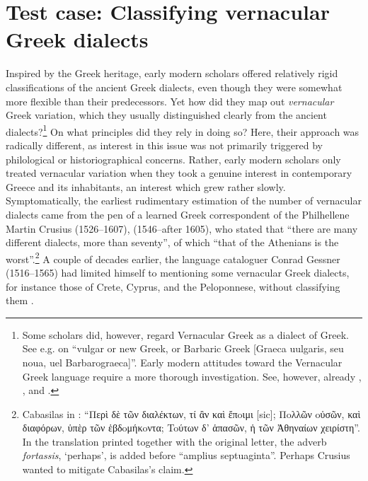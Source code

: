 \section{Test case: Classifying vernacular Greek dialects}\label{sec:2.10}

Inspired by the Greek heritage, early modern scholars offered relatively rigid classifications of the ancient Greek dialects, even though they were somewhat more flexible than their predecessors. Yet how did they map out \textit{vernacular} Greek variation, which they usually distinguished clearly from the ancient dialects?\footnote{Some scholars did, however, regard Vernacular Greek as a dialect of Greek. See e.g. \citet[{\footnotesize{)(}}.7\textsc{\textsuperscript{v}}]{Megiser1603} on “vulgar or new Greek, or Barbaric Greek [Graeca uulgaris, seu noua, uel Barbarograeca]”. Early modern attitudes toward the Vernacular Greek language require a more thorough investigation. See, however, already \citet{Caratzas1952}, \citet{Rotolo1973}, and \citet{Toufexis2005}.} On what principles did they rely in doing so? Here, their approach was radically different, as interest in this issue was not primarily triggered by philological or historiographical concerns. Rather, early modern scholars only treated vernacular variation when they took a genuine interest in contemporary Greece and its inhabitants, an interest which grew rather slowly. Symptomatically, the earliest rudimentary estimation of the number of vernacular dialects came from the pen of a learned Greek correspondent of the  Philhellene Martin Crusius (1526–1607),  (1546–after 1605), who stated that “there are many different dialects, more than seventy”, of which “that of the Athenians is the worst”.\footnote{Cabasilas in \citet[461]{Crusius1584}: “Περὶ δὲ τῶν διαλέκτων, τί ἂν καὶ ἔπoιμι [sic]; Πoλλῶν oὐσῶν, καὶ διαφόρων, ὑπὲρ τῶν ἑβδoμήκoντα; Toύτων δ' ἁπασῶν, ἡ τῶν Ἀθηναίων χειρίστη”. In the  translation printed together with the original letter, the adverb \textit{fortassis}, ‘perhaps’, is added before “amplius septuaginta”. Perhaps Crusius wanted to mitigate Cabasilas’s claim.} A couple of decades earlier, the  language cataloguer Conrad Gessner (1516–1565) had limited himself to mentioning some vernacular Greek dialects, for instance those of Crete, Cyprus, and the Peloponnese, without classifying them \citep[47\textsc{\textsuperscript{r}}]{Gessner1555}.

